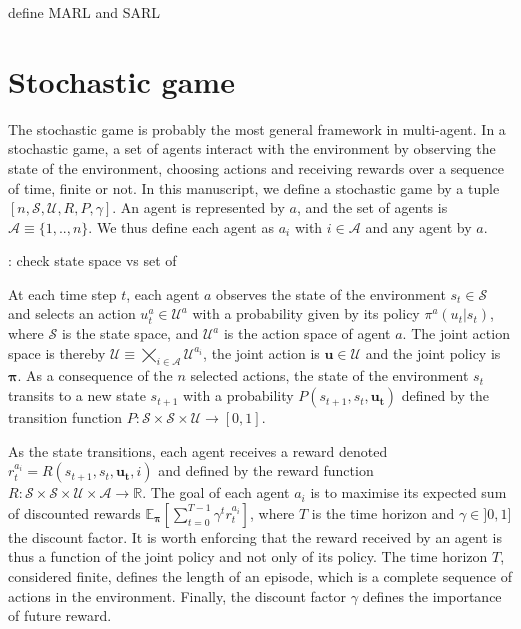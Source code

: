 define MARL and SARL

\section{Stochastic game}
\label{sec:ch2_stochastic_Game}
The stochastic game \citep{stochasticGames} is probably the most general framework in multi-agent.
In a stochastic game, a set of agents interact with the environment by observing the state of the environment, choosing actions and receiving rewards over a sequence of time, finite or not.
In this manuscript, we define a stochastic game by a tuple $[n, \mathcal{S}, \mathcal{U}, R, P, \gamma]$.
An agent is represented by $a$, and the set of agents is $\mathcal{A} \equiv \{1,..,n\}$.
We thus define each agent as $a_i$ with $i \in \mathcal{A}$ and any agent by $a$.

\todo: check state space vs set of 

At each time step $t$, each agent $a$ observes the state of the environment $s_t \in \mathcal{S}$ and selects an action $u_t^a \in \mathcal{U}^a$ with a probability given by its policy $\pi^a(u_t|s_t)$, where $\mathcal{S}$ is the state space, and $\mathcal{U}^a$ is the action space of agent $a$.
The joint action space is thereby $\mathcal{U} \equiv \bigtimes_{i \in \mathcal{A}} \mathcal{U}^{a_i}$, the joint action is $\mathbf{u} \in \mathcal{U}$ and the joint policy is $\mathbf{\pi}$.
As a consequence of the $n$ selected actions, the state of the environment $s_t$ transits to a new state $s_{t+1}$ with a probability $P(s_{t+1}, s_t, \mathbf{u_t})$ defined by the transition function $P:\mathcal{S} \times \mathcal{S} \times \mathcal{U} \rightarrow [0,1]$.

As the state transitions, each agent receives a reward denoted $r_t^{a_i} = R(s_{t+1}, s_t, \mathbf{u_t}, i)$ and defined by the reward function $R: \mathcal{S} \times \mathcal{S} \times \mathcal{U} \times \mathcal{A} \rightarrow \mathbb{R}$.
The goal of each agent $a_i$ is to maximise its expected sum of discounted rewards $\mathbb{E}_{\mathbf{\pi}}\left[ \sum_{t=0}^{T-1} \gamma^t r^{a_i}_t \right]$, where $T$ is the time horizon and $\gamma \in ]0, 1]$ the discount factor.
It is worth enforcing that the reward received by an agent is thus a function of the joint policy and not only of its policy.
The time horizon $T$, considered finite, defines the length of an episode, which is a complete sequence of actions in the environment.
Finally, the discount factor $\gamma$ defines the importance of future reward.

